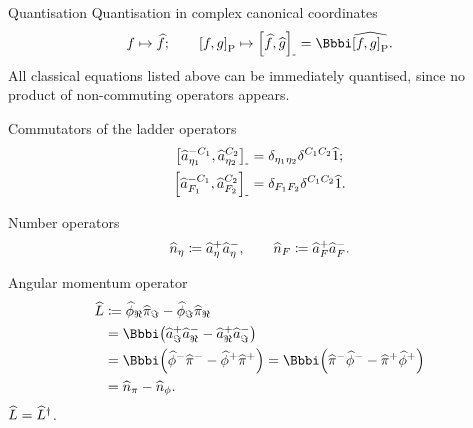 \documentclass[a4paper]{article}
\newcommand{\Poibr}[1]{\sbr{#1}_\text{P}}
\newcommand{\Combr}[1]{\sbr{#1}_\text{-}}
\newcommand{\tR}{\Re}
\newcommand{\tI}{\Im}
\begin{document}
\begin{nameddef}{Quantisation}
Quantisation in complex canonical coordinates
\begin{equation}
f \mapsto \what{f};\qquad
\Poibr{f,g} \mapsto \Combr{\what{f},\what{g}} = \ii \what{\Poibr{f,g}}.
\end{equation}
All classical equations listed above can be immediately quantised, since no 
product of non-commuting operators appears.


Commutators of the ladder operators
\begin{align}
\Combr{\what{a}_{\eta_1}^{-C_1}, \what{a}_{\eta_2}^{C_2}} &= 
\delta_{\eta_1 \eta_2} \delta^{C_1 C_2} \what{1}; \\
\Combr{\what{a}_{F_1}^{-C_1}, \what{a}_{F_2}^{C_2}}
&= \delta_{F_1 F_2} \delta^{C_1 C_2} \what{1}. \\
\end{align}

Number operators
\begin{equation}
{\widehat{n}}_\eta \coloneqq {\widehat{a}}_\eta^+ {\widehat{a}}_\eta^-,\qquad
{\widehat{n}}_F \coloneqq {\widehat{a}}_F^+ {\widehat{a}}_F^-.
\end{equation}


Angular momentum operator
\begin{align}
\what{L} &\coloneqq
\what{\phi}_\tR\what{\pi}_\tI - \what{\phi}_\tI\what{\pi}_\tR \nonumber \\
&= \ii\rbr{\what{a}_\tI^+\what{a}_\tR^- - \what{a}_\tR^+\what{a}_\tI^-}
\nonumber \\
&= \ii\rbr{\what{\phi}^-\what{\pi}^- - \what{\phi}^+\what{\pi}^+}
= \ii\rbr{\what{\pi}^-\what{\phi}^- - \what{\pi}^+\what{\phi}^+}
\nonumber \\
&= \what{n}_\pi - \what{n}_\phi.
\label{eq:angular-momentum}
\end{align}
${\widehat{L}} = {\widehat{L}}^\dagger$.


\end{nameddef}
\end{document}
